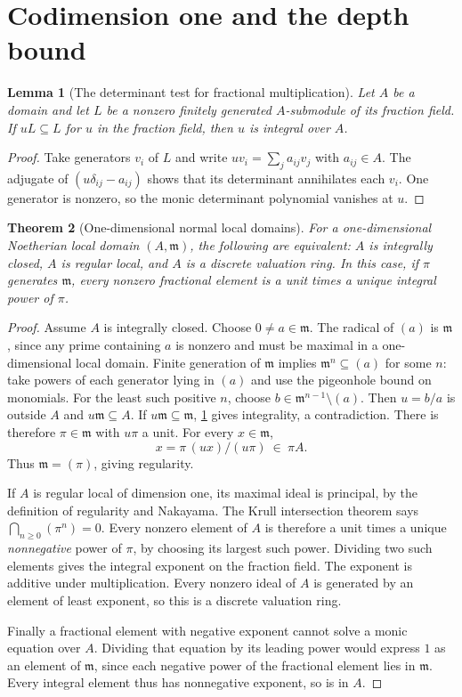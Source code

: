 \documentclass[11pt,oneside,openany]{book}
\newtheorem{theorem}{Theorem}[chapter]
\newtheorem{lemma}[theorem]{Lemma}
\theoremstyle{definition}
\theoremstyle{remark}
\begin{document}
\section{Codimension one and the depth bound}

\begin{lemma}[The determinant test for fractional multiplication]\label{res:SN-05}
Let $A$ be a domain and let $L$ be a nonzero finitely generated
$A$-submodule of its fraction field. If $uL\subseteq L$ for
$u$ in the fraction field, then $u$ is integral over $A$.
\end{lemma}
\begin{proof}
Take generators $v_i$ of $L$ and write $uv_i=\sum_j a_{ij}v_j$
with $a_{ij}\in A$. The adjugate of $(u\delta_{ij}-a_{ij})$
shows that its determinant annihilates each $v_i$. One generator
is nonzero, so the monic determinant polynomial vanishes at $u$.
\end{proof}

\begin{theorem}[One-dimensional normal local domains]\label{res:SN-06}
For a one-dimensional Noetherian local domain $(A,\mathfrak m)$,
the following are equivalent: $A$ is integrally closed, $A$ is
regular local, and $A$ is a discrete valuation ring. In this
case, if $\pi$ generates $\mathfrak m$, every nonzero fractional
element is a unit times a unique integral power of $\pi$.
\end{theorem}
\begin{proof}
Assume $A$ is integrally closed. Choose $0\ne a\in\mathfrak m$.
The radical of $(a)$ is $\mathfrak m$, since any prime containing
$a$ is nonzero and must be maximal in a one-dimensional local
domain. Finite generation of $\mathfrak m$ implies
$\mathfrak m^n\subseteq(a)$ for some $n$: take powers of each
generator lying in $(a)$ and use the pigeonhole bound on
monomials. For the least such positive $n$, choose
$b\in \mathfrak m^{n-1}\setminus(a)$. Then $u=b/a$ is outside
$A$ and $u\mathfrak m\subseteq A$. If
$u\mathfrak m\subseteq\mathfrak m$, \ref{res:SN-05} gives
integrality, a contradiction. There is therefore
$\pi\in\mathfrak m$ with $u\pi$ a unit. For every
$x\in\mathfrak m$,
\[
 x=\pi\,(ux)/(u\pi)\ \in\ \pi A.
\]
Thus $\mathfrak m=(\pi)$, giving regularity.

If $A$ is regular local of dimension one, its maximal ideal
is principal, by the definition of regularity and Nakayama.
The Krull intersection theorem \cite[ALG-05-C04-R04]{p103}
says $\bigcap_{n\ge0}(\pi^n)=0$. Every nonzero element of $A$
is therefore a unit times a unique \emph{nonnegative} power of
$\pi$, by choosing its largest such power. Dividing two such
elements gives the integral exponent on the fraction field.
The exponent is additive under multiplication. Every nonzero
ideal of $A$ is generated by an element of least exponent, so
this is a discrete valuation ring.

Finally a fractional element with negative exponent cannot
solve a monic equation over $A$. Dividing that equation by
its leading power would express $1$ as an element of
$\mathfrak m$, since each negative power of the fractional
element lies in $\mathfrak m$. Every integral element thus has
nonnegative exponent, so is in $A$.
\end{proof}
\end{document}
